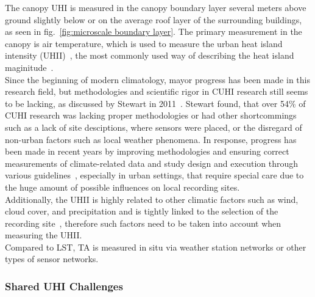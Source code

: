 The canopy UHI is measured in the canopy boundary layer several meters above ground slightly below or on the average roof layer of the surrounding buildings, as seen in fig.~\ref{fig:microscale boundary layer}. The primary measurement in the canopy is air temperature, which is used to measure the urban heat island intensity (UHII)~\cite{oke1973city}, the most commonly used way of describing the heat island maginitude~\cite{kim2021urban}.\\
Since the beginning of modern climatology, mayor progress has been made in this research field, but methodologies and scientific rigor in CUHI research still seems to be lacking, as discussed by Stewart in 2011~\cite{stewart2011systematic}. Stewart found, that over 54\% of CUHI research was lacking proper methodologies or had other shortcommings such as a lack of site desciptions, where sensors were placed, or the disregard of non-urban factors such as local weather phenomena. In response, progress has been made in recent years by improving methodologies and ensuring correct measurements of climate-related data and study design and execution through various guidelines~\cite{oke2006guideline}, especially in urban settings, that require special care due to the huge amount of possible influences on local recording sites.\\
Additionally, the UHII is highly related to other climatic factors such as wind, cloud cover, and precipitation and is tightly linked to the selection of the recording site~\cite{fenner2019contrasting}, therefore such factors need to be taken into account when measuring the UHII.\\
Compared to LST, TA is measured in situ via weather station networks or other types of sensor networks. 



\subsubsection{Shared UHI Challenges} %


